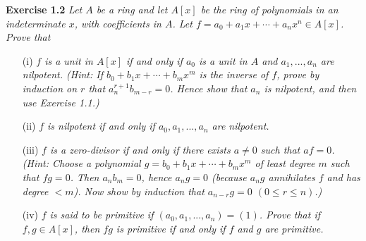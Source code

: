 \documentclass{article}
\begin{document}
\textbf{Exercise 1.2}
\emph{Let $A$ be a ring and
let $A[x]$ be the ring of polynomials in an indeterminate $x$,
with coefficients in $A$.
Let $f = a_0 + a_1 x + \cdots + a_n x^n \in A[x]$.
Prove that}
\begin{enumerate}
\item[(i)]
\emph{$f$ is a unit in $A[x]$ if and only if
$a_0$ is a unit in $A$ and
$a_1, ..., a_n$ are nilpotent.
(Hint: If $b_0 + b_1 x + \cdots + b_m x^m$ is the inverse of $f$,
prove by induction on $r$ that $a_n^{r+1} b_{m-r} = 0$.
Hence show that $a_n$ is nilpotent, and then use Exercise 1.1.)}
\item[(ii)]
\emph{$f$ is nilpotent if and only if
$a_0, a_1, ..., a_n$ are nilpotent.}
\item[(iii)]
\emph{$f$ is a zero-divisor if and only if
there exists $a \neq 0$ such that $af = 0$.
(Hint: Choose a polynomial $g = b_0 + b_1 x + \cdots + b_m x^m$
of least degree $m$ such that $fg = 0$.
Then $a_n b_m = 0$, hence $a_n g = 0$
(because $a_n g$ annihilates $f$ and has degree $< m$).
Now show by induction that $a_{n-r}g = 0$ $(0 \leq r \leq n)$.)}
\item[(iv)]
\emph{$f$ is said to be primitive if $(a_0, a_1, ..., a_n) = (1)$.
Prove that if $f, g \in A[x]$, then $fg$ is primitive if and only if
$f$ and $g$ are primitive.} \\
\end{enumerate}
\end{document}
